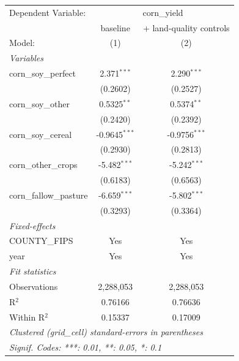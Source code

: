 
\begingroup
\centering
\begin{tabular}{lcc}
   \tabularnewline \midrule \midrule
   Dependent Variable: & \multicolumn{2}{c}{corn\_yield}\\
                           & baseline        & + land-quality controls \\   
   Model:                  & (1)             & (2)\\  
   \midrule
   \emph{Variables}\\
   corn\_soy\_perfect      & 2.371$^{***}$   & 2.290$^{***}$\\   
                           & (0.2602)        & (0.2527)\\   
   corn\_soy\_other        & 0.5325$^{**}$   & 0.5374$^{**}$\\   
                           & (0.2420)        & (0.2392)\\   
   corn\_soy\_cereal       & -0.9645$^{***}$ & -0.9756$^{***}$\\   
                           & (0.2930)        & (0.2813)\\   
   corn\_other\_crops      & -5.482$^{***}$  & -5.242$^{***}$\\   
                           & (0.6183)        & (0.6563)\\   
   corn\_fallow\_pasture   & -6.659$^{***}$  & -5.802$^{***}$\\   
                           & (0.3293)        & (0.3364)\\   
   \midrule
   \emph{Fixed-effects}\\
   COUNTY\_FIPS            & Yes             & Yes\\  
   year                    & Yes             & Yes\\  
   \midrule
   \emph{Fit statistics}\\
   Observations            & 2,288,053       & 2,288,053\\  
   R$^2$                   & 0.76166         & 0.76636\\  
   Within R$^2$            & 0.15337         & 0.17009\\  
   \midrule \midrule
   \multicolumn{3}{l}{\emph{Clustered (grid\_cell) standard-errors in parentheses}}\\
   \multicolumn{3}{l}{\emph{Signif. Codes: ***: 0.01, **: 0.05, *: 0.1}}\\
\end{tabular}
\par\endgroup


